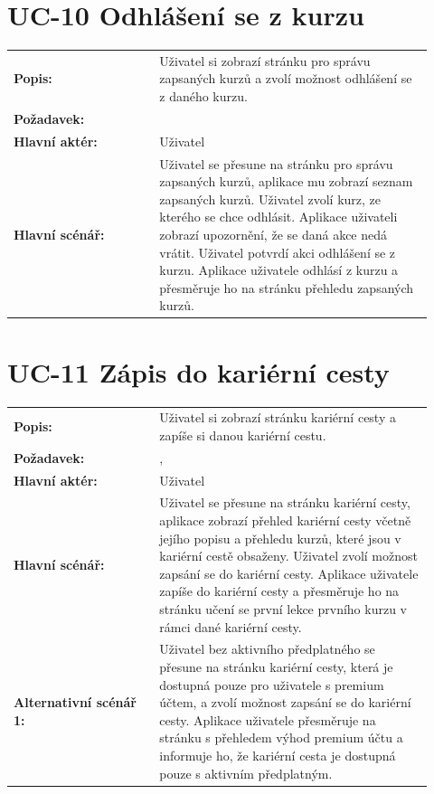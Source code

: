 \section{UC-10 Odhlášení se z kurzu}\label{sec:uc-10}

\begin{tabular}{p{0.32\linewidth}p{0.6\linewidth}}
  \textbf{Popis:} & Uživatel si zobrazí stránku pro správu zapsaných kurzů a zvolí možnost odhlášení se z daného kurzu. \\
  \textbf{Požadavek:} & \nameref{sec:fp-course-management} \\
  \textbf{Hlavní aktér:} & Uživatel \\
  \textbf{Hlavní scénář:} & Uživatel se přesune na stránku pro správu zapsaných kurzů, aplikace mu zobrazí seznam zapsaných kurzů. Uživatel zvolí kurz, ze kterého se chce odhlásit. Aplikace uživateli zobrazí upozornění, že se daná akce nedá vrátit. Uživatel potvrdí akci odhlášení se z kurzu. Aplikace uživatele odhlásí z kurzu a přesměruje ho na stránku přehledu zapsaných kurzů. \\
\end{tabular}


\section{UC-11 Zápis do kariérní cesty}\label{sec:uc-11}

\begin{tabular}{p{0.32\linewidth}p{0.6\linewidth}}
  \textbf{Popis:} & Uživatel si zobrazí stránku kariérní cesty a zapíše si danou kariérní cestu. \\
  \textbf{Požadavek:} & \nameref{sec:fp-learning-paths}, \nameref{sec:fp-subscription-system} \\
  \textbf{Hlavní aktér:} & Uživatel \\
  \textbf{Hlavní scénář:} & Uživatel se přesune na stránku kariérní cesty, aplikace zobrazí přehled kariérní cesty včetně jejího popisu a přehledu kurzů, které jsou v kariérní cestě obsaženy. Uživatel zvolí možnost zapsání se do kariérní cesty. Aplikace uživatele zapíše do kariérní cesty a přesměruje ho na stránku učení se první lekce prvního kurzu v rámci dané kariérní cesty. \\
  \textbf{Alternativní scénář 1:} & Uživatel bez aktivního předplatného se přesune na stránku kariérní cesty, která je dostupná pouze pro uživatele s premium účtem, a zvolí možnost zapsání se do kariérní cesty. Aplikace uživatele přesměruje na stránku s přehledem výhod premium účtu a informuje ho, že kariérní cesta je dostupná pouze s aktivním předplatným. \\
\end{tabular}

